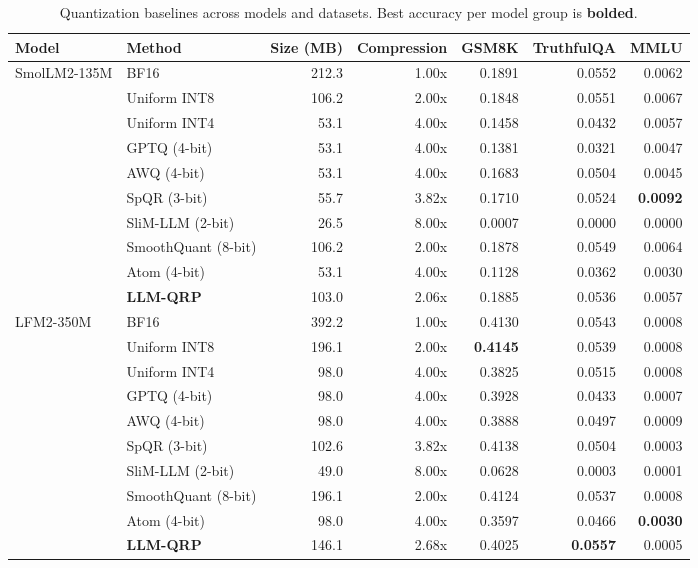 \begin{table}[htbp]
  \centering
  \footnotesize
  \caption{Quantization baselines across models and datasets. Best accuracy per model group is \textbf{bolded}.}
  \label{tab:combined_benchmark}
  \begin{tabular}{l lrrrrr}
    \toprule
    \textbf{Model} & \textbf{Method} & \textbf{Size (MB)} & \textbf{Compression} & \textbf{GSM8K} & \textbf{TruthfulQA} & \textbf{MMLU} \\
    \midrule
    SmolLM2-135M & BF16 & 212.3 & 1.00x & 0.1891 & 0.0552 & 0.0062 \\
     & Uniform INT8 & 106.2 & 2.00x & 0.1848 & 0.0551 & 0.0067 \\
     & Uniform INT4 & 53.1 & 4.00x & 0.1458 & 0.0432 & 0.0057 \\
     & GPTQ (4-bit) & 53.1 & 4.00x & 0.1381 & 0.0321 & 0.0047 \\
     & AWQ (4-bit) & 53.1 & 4.00x & 0.1683 & 0.0504 & 0.0045 \\
     & SpQR (3-bit) & 55.7 & 3.82x & 0.1710 & 0.0524 & \textbf{0.0092} \\
     & SliM-LLM (2-bit) & 26.5 & 8.00x & 0.0007 & 0.0000 & 0.0000 \\
     & SmoothQuant (8-bit) & 106.2 & 2.00x & 0.1878 & 0.0549 & 0.0064 \\
     & Atom (4-bit) & 53.1 & 4.00x & 0.1128 & 0.0362 & 0.0030 \\
     & \textbf{LLM-QRP} & 103.0 & 2.06x & 0.1885 & 0.0536 & 0.0057 \\
    \midrule
    LFM2-350M & BF16 & 392.2 & 1.00x & 0.4130 & 0.0543 & 0.0008 \\
     & Uniform INT8 & 196.1 & 2.00x & \textbf{0.4145} & 0.0539 & 0.0008 \\
     & Uniform INT4 & 98.0 & 4.00x & 0.3825 & 0.0515 & 0.0008 \\
     & GPTQ (4-bit) & 98.0 & 4.00x & 0.3928 & 0.0433 & 0.0007 \\
     & AWQ (4-bit) & 98.0 & 4.00x & 0.3888 & 0.0497 & 0.0009 \\
     & SpQR (3-bit) & 102.6 & 3.82x & 0.4138 & 0.0504 & 0.0003 \\
     & SliM-LLM (2-bit) & 49.0 & 8.00x & 0.0628 & 0.0003 & 0.0001 \\
     & SmoothQuant (8-bit) & 196.1 & 2.00x & 0.4124 & 0.0537 & 0.0008 \\
     & Atom (4-bit) & 98.0 & 4.00x & 0.3597 & 0.0466 & \textbf{0.0030} \\
     & \textbf{LLM-QRP} & 146.1 & 2.68x & 0.4025 & \textbf{0.0557} & 0.0005 \\

\end{tabular}
\end{table}
